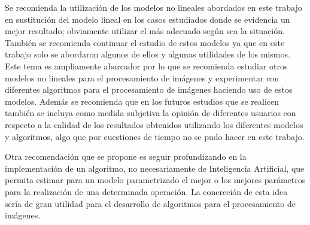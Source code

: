 \begin{recomendations}
    Se recomienda la utilizaci\'on de los modelos no lineales abordados en este trabajo en sustituci\'on del modelo lineal en los casos estudiados donde se evidencia un mejor resultado; obviamente utilizar el m\'as adecuado seg\'un sea la situaci\'on. Tambi\'en se recomienda continuar el estudio de estos modelos ya que en este trabajo solo se abordaron algunos de ellos y algunas utilidades de los mismos. Este tema es ampliamente abarcador por lo que se recomienda estudiar otros modelos no lineales para el procesamiento de im\'agenes y experimentar con diferentes algoritmos para el procesamiento de im\'agenes haciendo uso de estos modelos. Adem\'as se recomienda que en los futuros estudios que se realicen tambi\'en se incluya como medida subjetiva la opini\'on de diferentes usuarios con respecto a la calidad de los resultados obtenidos utilizando los diferentes modelos y algoritmos, algo que por cuestiones de tiempo no se pudo hacer en este trabajo.
    
    Otra recomendaci\'on que se propone es seguir profundizando en la implementaci\'on de un algoritmo, no necesariamente de Inteligencia Artificial, que permita estimar para un modelo parametrizado el mejor o los mejores par\'ametros para la realizaci\'on de una determinada operaci\'on. La concreci\'on de esta idea ser\'ia de gran utilidad para el desarrollo de algoritmos para el procesamiento de im\'agenes.
\end{recomendations}
